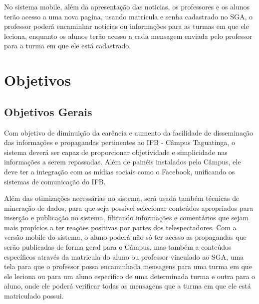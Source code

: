 No sistema mobile, além da apresentação das noticias, os professores e os alunos
terão acesso a uma nova pagina, usando matricula e senha cadastrado no SGA, o professor
poderá encaminhar noticias ou informações para as turmas em que ele leciona, enquanto
os alunos terão acesso a cada mensagem enviada pelo professor para a turma em que ele
está cadastrado.

\section{Objetivos}
\subsection{Objetivos Gerais}
Com objetivo de diminuição da carência e aumento da facilidade de disseminação
das informações e propagandas pertinentes ao IFB - Câmpus Taguatinga, o sistema deverá
ser capaz de proporcionar objetividade e simplicidade nas informações a serem repassadas.
Além de painéis instalados pelo Câmpus, ele deve ter a integração com as mídias sociais
como o Facebook, unificando os sistemas de comunicação do IFB.

Além das otimizações necessárias no sistema, será usada também técnicas de mineração
de dados, para que seja possível selecionar conteúdos apropriados para inserção
e publicação no sistema, filtrando informações e comentários que sejam mais propícios a
ter reações positivas por partes dos telespectadores. Com a versão mobile do sistema, o
aluno poderá não só ter acesso as propagandas que serão publicadas de forma geral para o
Câmpus, mas também a conteúdos específicos através da matricula do aluno ou professor
vinculado ao SGA, uma tela para que o professor possa encaminhada mensagens para
uma turma em que ele leciona ou para um aluno especifico de uma determinada turma e
outra para o aluno, onde ele poderá verificar todas as mensagens que a turma em que ele
está matriculado possui.



